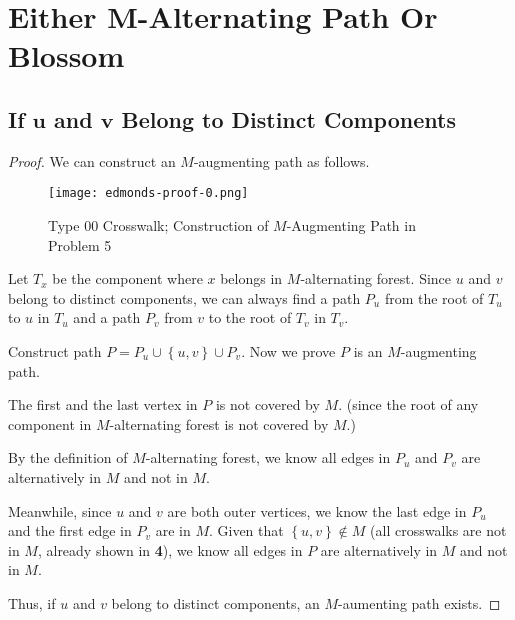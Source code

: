 \documentclass{article}
\newcommand{\set}[1]{\left\{#1\right\}}
\newcommand{\bd}[1]{\boldsymbol{#1}}
\begin{document}
\vspace{0.5em}
\section{Either $\bd{M}$-Alternating Path Or Blossom}
\vspace{0.5em}
\subsection{If $\bd{u}$ and $\bd{v}$ Belong to Distinct Components}
\vspace{0.5em}
\begin{proof}
    We can construct an $M$-augmenting path as follows.
    
    \vspace{-0.5em}
    \begin{figure}[tbh]
        \centering
        \texttt{[image: edmonds-proof-0.png]}
        \caption{Type 00 Crosswalk; Construction of $M$-Augmenting Path in Problem 5}
        \label{12}
    \end{figure}
    
    \vspace{-0.25em} \hspace{1.3em}
    Let $T_x$ be the component where $x$ belongs in $M$-alternating forest. Since $u$ and $v$ belong to distinct components, we can always find a path $P_u$ from the root of $T_u$ to $u$ in $T_u$ and a path $P_v$ from $v$ to the root of $T_v$ in $T_v$. 
    
    \vspace{0.75em} \hspace{1.3em}
    Construct path $P=P_u\cup\set{u,v}\cup P_v.$ Now we prove $P$ is an $M$-augmenting path.
    
    \hspace{1.3em}
    The first and the last vertex in $P$ is not covered by $M$. (since the root of any component in $M$-alternating forest is not covered by $M$.)
    
    \hspace{1.3em}
    By the definition of $M$-alternating forest, we know all edges in $P_u$ and $P_v$ are alternatively in $M$ and not in $M$. 
    
    \hspace{1.3em}
    Meanwhile, since $u$ and $v$ are both outer vertices, we know the last edge in $P_u$ and the first edge in $P_v$ are in $M$. Given that $\set{u,v}\notin M$ (all crosswalks are not in $M$, already shown in \textbf{4}), we know all edges in $P$ are alternatively in $M$ and not in $M$.
    
    \vspace{0.75em} \hspace{1.3em}
    Thus, if $u$ and $v$ belong to distinct components, an $M$-aumenting path exists.
\end{proof}
\end{document}
